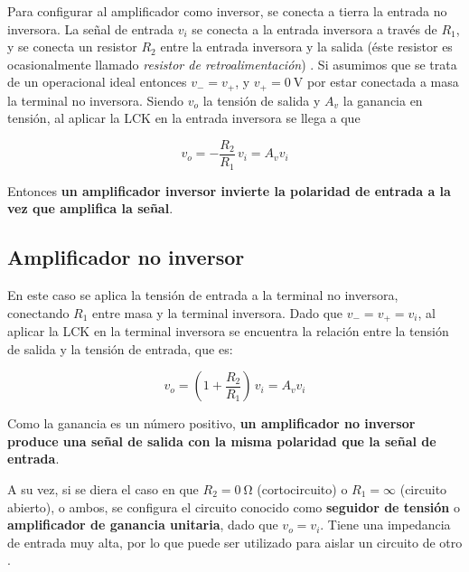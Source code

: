 
Para configurar al amplificador como inversor, se conecta a tierra la entrada no inversora. La señal de entrada $v_i$ se conecta a la entrada inversora a través de $R_1$, y se conecta un resistor $R_2$ entre la entrada inversora y la salida (éste resistor es ocasionalmente llamado \textit{resistor de retroalimentación}) \cite[pág. 181]{FDCE}.
Si asumimos que se trata de un operacional ideal entonces $v_{-} = v_{+}$, y $v_{+} = \SI{0}{\volt}$ por estar conectada a masa la terminal no inversora. Siendo $v_o$ la tensión de salida y $A_v$ la ganancia en tensión, al aplicar la LCK en la entrada inversora se llega a que

\begin{equation}
    \label{ec:intro:opamp-inversor}
    v_o = - \frac{R_2}{R_1} \, v_i = A_v v_i
\end{equation}

Entonces \textbf{un amplificador inversor invierte la polaridad de entrada a la vez que amplifica la señal}.

\subsection{Amplificador no inversor}
\label{sec:intro:opamp-noinversor}


En este caso se aplica la tensión de entrada a la terminal no inversora, conectando $R_1$ entre masa y la terminal inversora. Dado que $v_{-} = v_{+} = v_i$, al aplicar la LCK en la terminal inversora se encuentra la relación entre la tensión de salida y la tensión de entrada, que es:

\begin{equation}
    \label{ec:intro:opamp-noinversor}
    v_o = \left(1 + \frac{R_2}{R_1}\right) \, v_i = A_v v_i
\end{equation}

Como la ganancia es un número positivo, \textbf{un amplificador no inversor produce una señal de salida con la misma polaridad que la señal de entrada}.

A su vez, si se diera el caso en que $R_2 = \SI{0}{\ohm}$ (cortocircuito) o $R_1 = \infty$ (circuito abierto), o ambos, se configura el circuito conocido como \textbf{seguidor de tensión} o \textbf{amplificador de ganancia unitaria}, dado que $v_o = v_i$. Tiene una impedancia de entrada muy alta, por lo que puede ser utilizado para aislar un circuito de otro \cite[pág. 184]{FDCE}.
